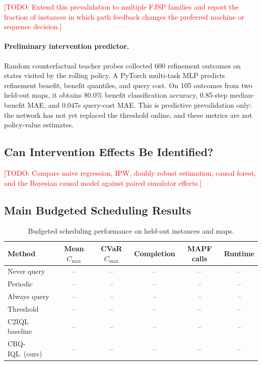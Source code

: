 \documentclass[11pt,a4paper]{article}
\newcommand{\algo}{CBQ-IQL}
\newcommand{\cmax}{C_{\max}}
\newcommand{\todo}[1]{\textcolor{red}{[TODO: #1]}}
\begin{document}
\todo{Extend this prevalidation to multiple FJSP families and report the
fraction of instances in which path feedback changes the preferred machine or
sequence decision.}

\paragraph{Preliminary intervention predictor.}
Random counterfactual teacher probes collected 600 refinement outcomes on
states visited by the rolling policy. A PyTorch multi-task MLP predicts
refinement benefit, benefit quantiles, and query cost. On 105 outcomes from two
held-out maps, it obtains 80.0\% benefit classification accuracy, 0.85-step
median-benefit MAE, and 0.047s query-cost MAE. This is predictive
prevalidation only: the network has not yet replaced the threshold online, and
these metrics are not policy-value estimates.

\subsection{Can Intervention Effects Be Identified?}

\todo{Compare naive regression, IPW, doubly robust estimation, causal forest,
and the Bayesian causal model against paired simulator effects.}

\subsection{Main Budgeted Scheduling Results}

\begin{table}[t]
\centering
\caption{Budgeted scheduling performance on held-out instances and maps.}
\label{tab:main}
\begin{tabular}{lccccc}
\toprule
Method & Mean \(\cmax\) & CVaR \(\cmax\) & Completion & MAPF calls & Runtime \\
\midrule
Never query & -- & -- & -- & -- & -- \\
Periodic & -- & -- & -- & -- & -- \\
Always query & -- & -- & -- & -- & -- \\
Threshold & -- & -- & -- & -- & -- \\
C2IQL baseline & -- & -- & -- & -- & -- \\
\algo\ (ours) & -- & -- & -- & -- & -- \\
\bottomrule
\end{tabular}
\end{table}
\end{document}
